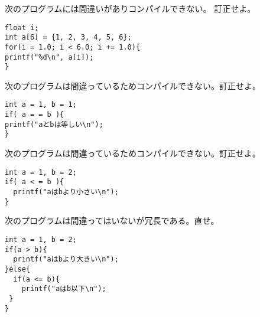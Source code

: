\documentclass[12pt,a4j]{jarticle}
\newcounter{toi}
\def\toi{%
\bigskip\bigskip\noindent
\addtocounter{toi}{1}
\shadowbox{\bfseries\large 問\thetoi}
\nopagebreak[4]\bigskip\nopagebreak[4]
}
\begin{document}




\toi


次のプログラムには間違いがありコンパイルできない。
訂正せよ。
\begin{verbatim}
float i;
int a[6] = {1, 2, 3, 4, 5, 6};
for(i = 1.0; i < 6.0; i += 1.0){
printf("%d\n", a[i]);
}
\end{verbatim}



\toi



次のプログラムは間違っているためコンパイルできない。訂正せよ。
\begin{verbatim}
int a = 1, b = 1;
if( a = = b ){
printf("aとbは等しい\n");
}
\end{verbatim}



\toi


次のプログラムは間違っているためコンパイルできない。訂正せよ。
\begin{verbatim}
int a = 1, b = 2;
if( a < = b ){
  printf("aはbより小さい\n");
}
\end{verbatim}





\toi



次のプログラムは間違ってはいないが冗長である。直せ。
\begin{verbatim}
int a = 1, b = 2;
if(a > b){
  printf("aはbより大きい\n");
}else{
  if(a <= b){
    printf("aはb以下\n");
 }
}
\end{verbatim}


\end{document}
